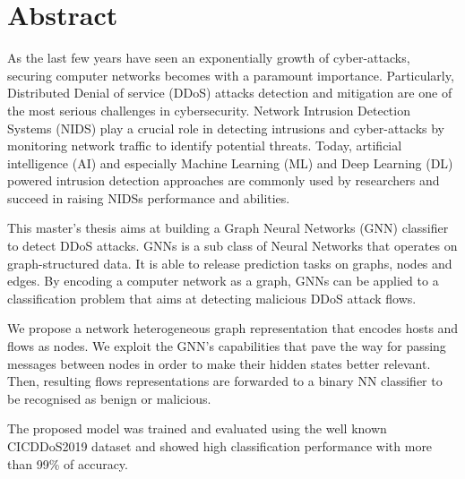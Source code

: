 \chapter*{Abstract}

As the last few years have seen an exponentially growth of cyber-attacks, securing computer networks becomes with a paramount importance. Particularly, Distributed Denial of service (DDoS) attacks detection and mitigation are one of the most serious challenges in cybersecurity. Network Intrusion Detection Systems (NIDS) play a crucial role in detecting intrusions and cyber-attacks by monitoring network traffic to identify potential threats. Today, artificial intelligence (AI) and especially Machine Learning (ML) and Deep Learning (DL) powered intrusion detection approaches are commonly used by researchers and succeed in raising NIDSs performance and abilities. 

This master’s thesis aims at building a Graph Neural Networks (GNN) classifier to detect DDoS attacks. GNNs is a sub class of Neural Networks that operates on graph-structured data. It is able to release prediction tasks on graphs, nodes and edges. By encoding a computer network as a graph, GNNs can be applied to a classification problem that aims at detecting malicious DDoS attack flows. 

We propose a network heterogeneous graph representation that encodes hosts and flows as nodes. We exploit the GNN's capabilities that pave the way for passing messages between nodes in order to make their hidden states better relevant. Then, resulting flows representations are forwarded to a binary NN classifier to be recognised as benign or malicious.

The proposed model was trained and evaluated using the well known CICDDoS2019 dataset and showed high classification performance with more than 99\% of accuracy.
